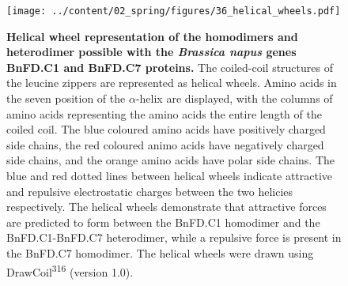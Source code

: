 \documentclass[12pt,]{book}
\begin{document}
\begin{figure}[htbp]
\centering
\texttt{[image: ../content/02\_spring/figures/36\_helical\_wheels.pdf]}
\caption{\textbf{Helical wheel representation of the homodimers and
heterodimer possible with the \emph{Brassica napus} genes BnFD.C1 and
BnFD.C7 proteins.} The coiled-coil structures of the leucine zippers are
represented as helical wheels. Amino acids in the seven position of the
\(\alpha\)-helix are displayed, with the columns of amino acids
representing the amino acids the entire length of the coiled coil. The
blue coloured amino acids have positively charged side chains, the red
coloured animo acids have negatively charged side chains, and the orange
amino acids have polar side chains. The blue and red dotted lines
between helical wheels indicate attractive and repulsive electrostatic
charges between the two helicies respectively. The helical wheels
demonstrate that attractive forces are predicted to form between the
BnFD.C1 homodimer and the BnFD.C1-BnFD.C7 heterodimer, while a repulsive
force is present in the BnFD.C7 homodimer. The helical wheels were drawn
using DrawCoil\textsuperscript{316} (version
1.0).}\label{figure:236b:helicalwheels}
\end{figure}
\end{document}
